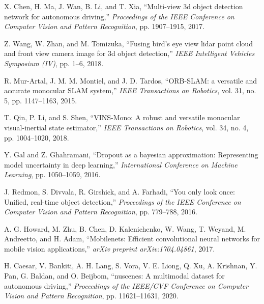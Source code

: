 \documentclass[10pt]{article}
\begin{document}
\begin{thebibliography}{99}
X. Chen, H. Ma, J. Wan, B. Li, and T. Xia,
``Multi-view 3d object detection network for autonomous driving,''
\emph{Proceedings of the IEEE Conference on Computer Vision and Pattern Recognition}, pp. 1907--1915, 2017.

Z. Wang, W. Zhan, and M. Tomizuka,
``Fusing bird's eye view lidar point cloud and front view camera image for 3d object detection,''
\emph{IEEE Intelligent Vehicles Symposium (IV)}, pp. 1--6, 2018.

R. Mur-Artal, J. M. M. Montiel, and J. D. Tardos,
``ORB-SLAM: a versatile and accurate monocular SLAM system,''
\emph{IEEE Transactions on Robotics}, vol. 31, no. 5, pp. 1147--1163, 2015.

T. Qin, P. Li, and S. Shen,
``VINS-Mono: A robust and versatile monocular visual-inertial state estimator,''
\emph{IEEE Transactions on Robotics}, vol. 34, no. 4, pp. 1004--1020, 2018.

Y. Gal and Z. Ghahramani,
``Dropout as a bayesian approximation: Representing model uncertainty in deep learning,''
\emph{International Conference on Machine Learning}, pp. 1050--1059, 2016.

J. Redmon, S. Divvala, R. Girshick, and A. Farhadi,
``You only look once: Unified, real-time object detection,''
\emph{Proceedings of the IEEE Conference on Computer Vision and Pattern Recognition}, pp. 779--788, 2016.

A. G. Howard, M. Zhu, B. Chen, D. Kalenichenko, W. Wang, T. Weyand, M. Andreetto, and H. Adam,
``Mobilenets: Efficient convolutional neural networks for mobile vision applications,''
\emph{arXiv preprint arXiv:1704.04861}, 2017.

H. Caesar, V. Bankiti, A. H. Lang, S. Vora, V. E. Liong, Q. Xu, A. Krishnan, Y. Pan, G. Baldan, and O. Beijbom,
``nuscenes: A multimodal dataset for autonomous driving,''
\emph{Proceedings of the IEEE/CVF Conference on Computer Vision and Pattern Recognition}, pp. 11621--11631, 2020.

\end{thebibliography}
\end{document}

